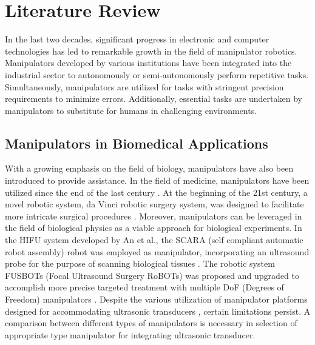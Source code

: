 \section{Literature Review} 
In the last two decades, significant progress in electronic and computer technologies has led to remarkable 
growth in the field of manipulator robotics. Manipulators developed by various institutions have been integrated 
into the industrial sector to autonomously or semi-autonomously perform repetitive tasks. Simultaneously, 
manipulators are utilized for tasks with stringent precision requirements to minimize errors. Additionally, 
essential tasks are undertaken by manipulators to substitute for humans in challenging environments. 
\subsection{Manipulators in Biomedical Applications}
With a growing emphasis on the field of biology, manipulators have also been introduced to provide assistance. 
In the field of medicine, manipulators have been utilized since the end of the last century 
\cite{AESOP,ZEUS,ZEUS_example1,ZEUS_example2,ZEUS_example3}. At the beginning of the 21st century, a novel 
robotic system, da Vinci robotic surgery system, was designed to facilitate more intricate surgical procedures 
\cite{da_Vinci}. Moreover, manipulators can be leveraged in the field of biological physics as a viable approach 
for biological experiments. In the HIFU system developed by An et al., the SCARA (self compliant automatic robot 
assembly) robot was employed as manipulator, incorporating an ultrasound probe for the purpose of scanning 
biological tissues \cite{HIFU2017}. The robotic system FUSBOTs (Focal Ultrasound Surgery RoBOTs) was proposed 
and upgraded to accomplish more precise targeted treatment with multiple DoF (Degrees of Freedom) manipulators 
\cite{FUSBOT,FUSBOT_example1,FUSBOT_example2}. Despite the various utilization of manipulator platforms 
designed for accommodating ultrasonic transducers \cite{6DOF_HIFU,6DOF_HIFU_comp,6DOF_HIFU_ABB}, 
certain limitations persist. A comparison between different types of manipulators is necessary in 
selection of appropriate type manipulator for integrating ultrasonic transducer. 
